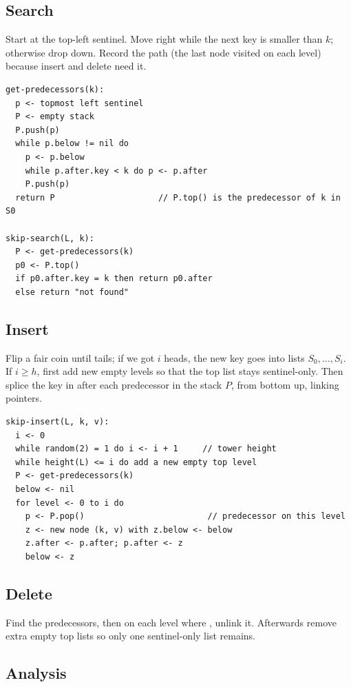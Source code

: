 \subsection{Search}

Start at the top-left sentinel. Move right while the next key is smaller than
$k$; otherwise drop down. Record the path (the last node visited on each level)
because insert and delete need it.
\begin{lstlisting}
get-predecessors(k):
  p <- topmost left sentinel
  P <- empty stack
  P.push(p)
  while p.below != nil do
    p <- p.below
    while p.after.key < k do p <- p.after
    P.push(p)
  return P                     // P.top() is the predecessor of k in S0

skip-search(L, k):
  P <- get-predecessors(k)
  p0 <- P.top()
  if p0.after.key = k then return p0.after
  else return "not found"
\end{lstlisting}

\subsection{Insert}

Flip a fair coin until tails; if we got $i$ heads, the new key goes into lists
$S_0, \ldots, S_i$. If $i \ge h$, first add new empty levels so that the top
list stays sentinel-only. Then splice the key in after each predecessor in the
stack $P$, from bottom up, linking  pointers.

\begin{lstlisting}
skip-insert(L, k, v):
  i <- 0
  while random(2) = 1 do i <- i + 1     // tower height
  while height(L) <= i do add a new empty top level
  P <- get-predecessors(k)
  below <- nil
  for level <- 0 to i do
    p <- P.pop()                         // predecessor on this level
    z <- new node (k, v) with z.below <- below
    z.after <- p.after; p.after <- z
    below <- z
\end{lstlisting}

\subsection{Delete}

Find the predecessors, then on each level where , unlink
it. Afterwards remove extra empty top lists so only one sentinel-only list remains.

\subsection{Analysis}

